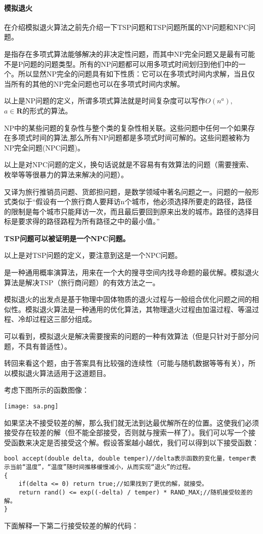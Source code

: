 \paragraph{模拟退火}
在介绍模拟退火算法之前先介绍一下TSP问题和TSP问题所属的NP问题和NPC问题。
\begin{definition}[NP问题] 是指存在多项式算法能够解决的非决定性问题，而其中NP完全问题又是最有可能不是P问题的问题类型。所有的NP问题都可以用多项式时间划归到他们中的一个。所以显然NP完全的问题具有如下性质：它可以在多项式时间内求解，当且仅当所有的其他的NP完全问题也可以在多项式时间内求解。
\end{definition}
以上是NP问题的定义，所谓多项式算法就是时间复杂度可以写作$O(n^a), $\\$a\in \mathbf{R}$的形式的算法。
\begin{definition}[NPC问题]NP中的某些问题的复杂性与整个类的复杂性相关联。这些问题中任何一个如果存在多项式时间的算法,那么所有NP问题都是多项式时间可解的。这些问题被称为NP完全问题(NPC问题)。
\end{definition}
	以上是对NPC问题的定义，换句话说就是不容易有有效算法的问题（需要搜索、枚举等等很暴力的算法来解决的问题）。
	\begin{definition}[TSP问题]又译为旅行推销员问题、货郎担问题，是数学领域中著名问题之一。问题的一般形式类似于“假设有一个旅行商人要拜访n个城市，他必须选择所要走的路径，路径的限制是每个城市只能拜访一次，而且最后要回到原来出发的城市。路径的选择目标是要求得的路径路程为所有路径之中的最小值。”

		\textbf{TSP问题可以被证明是一个NPC问题。}
	\end{definition}
	以上是对TSP问题的定义，要注意到这是一个NPC问题。
	\begin{definition}[模拟退火算法]是一种通用概率演算法，用来在一个大的搜寻空间内找寻命题的最优解。模拟退火算法是解决TSP（旅行商问题）的有效方法之一。

		模拟退火的出发点是基于物理中固体物质的退火过程与一般组合优化问题之间的相似性。模拟退火算法是一种通用的优化算法，其物理退火过程由加温过程、等温过程、冷却过程这三部分组成。
	\end{definition}
	可以看到，模拟退火是解决需要搜索的问题的一种有效算法（但是只针对于部分问题，不具有普适性）。

	转回来看这个题，由于答案具有比较强的连续性（可能与随机数据等等有关），所以模拟退火算法适用于这道题目。

	考虑下图所示的函数图像：
	\begin{center}\texttt{[image: sa.png]}\end{center}
	如果坚决不接受较差的解，那么我们就无法到达最优解所在的位置。这使我们必须接受存在较差的解（但不能全部接受，否则就与搜索一样了）。我们可以写一个接受函数来决定是否接受这个解。假设答案越小越优，我们可以得到以下接受函数：
	\begin{verbatim}
bool accept(double delta, double temper)//delta表示函数的变化量，temper表示当前“温度”，“温度”随时间推移缓慢减小，从而实现“退火”的过程。
{
    if(delta <= 0) return true;//如果找到了更优的解，就接受。
    return rand() <= exp((-delta) / temper) * RAND_MAX;//随机接受较差的解。
}
\end{verbatim}
	下面解释一下第二行接受较差的解的代码：

